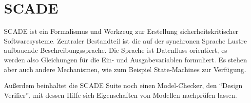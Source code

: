 \section{SCADE}
SCADE ist ein Formalismus und Werkzeug zur Erstellung sicherheitskritischer Softwaresysteme.
Zentraler Bestandteil ist die auf der synchronen Sprache Lustre aufbauende Beschreibungssprache.
Die Sprache ist Datenfluss-orientiert, es werden also Gleichungen für die Ein- und Ausgabevariablen formuliert.
Es stehen aber auch andere Mechanismen, wie zum Beispiel State-Machines zur Verfügung.

Außerdem beinhaltet die SCADE Suite noch einen Model-Checker, den "`Design Verifier"', mit dessen Hilfe sich Eigenschaften von Modellen nachprüfen lassen.